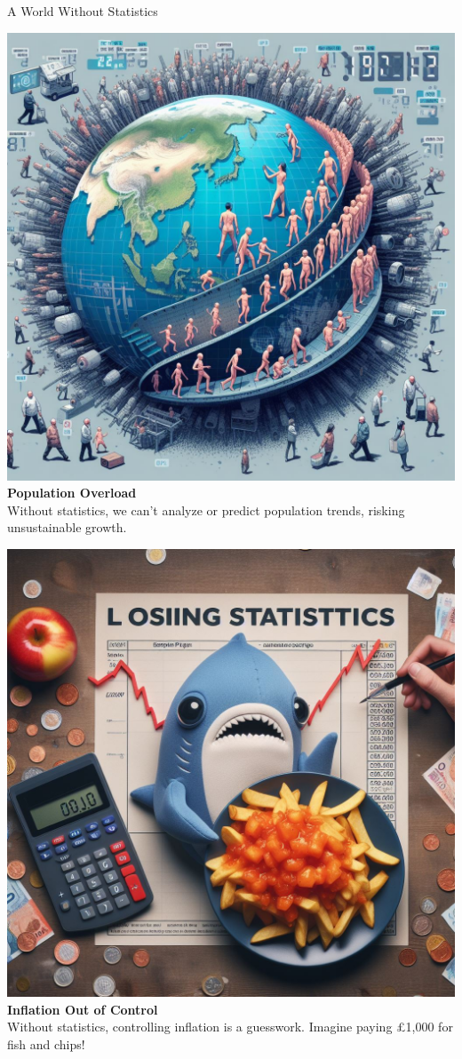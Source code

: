 \documentclass[final]{beamer}
\begin{document}
\begin{frame}[t]{}
\begin{columns}[t]
\begin{column}{.33\textwidth}
\begin{block}{A World Without Statistics}
				\begin{minipage}{0.43\textwidth}
					\centering
					\includegraphics[width=0.7\linewidth]{./images/2-3-1-PopulationOverload.jpeg}\\
					\vspace{0.5cm}  
					\textbf{Population Overload}\\
					\small Without statistics, we can't analyze or predict population trends, risking unsustainable growth.
				\end{minipage}
				\hfill
				\begin{minipage}{0.43\textwidth}
					\centering
					\includegraphics[width=0.7\linewidth]{./images/2-3-2-Inflation.jpeg}\\
					\vspace{0.5cm}  
					\textbf{Inflation Out of Control}\\
					\small Without statistics, controlling inflation is a guesswork. Imagine paying £1,000 for fish and chips!
				\end{minipage}


\end{block}
\end{column}
\end{columns}
\end{frame}
\end{document}
